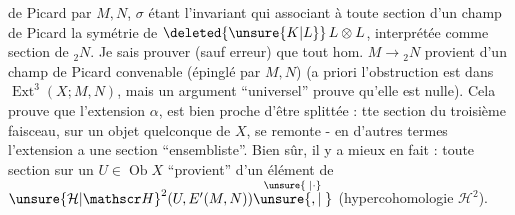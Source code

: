  de Picard  par $M,N$, $\sigma$ étant l'invariant qui  associant à toute section  d'un champ de Picard la symétrie de $\deleted{\unsure{K|L}}\,L\otimes L$, interprétée comme section de ${}_{2}N$. Je sais prouver (sauf erreur) que tout hom. $M\to{}_{2}N$ provient d'un champ de Picard convenable (épinglé par $M,N$) (a priori l'obstruction est dans $\operatorname{Ext}^{3}(X;M,N)$, mais un argument ``universel'' prouve qu'elle est nulle). Cela prouve que l'extension $\alpha$, est bien proche d'être splittée :  tte section du troisième faisceau, sur un objet quelconque de $X$, se remonte - en d'autres termes l'extension a une section ``ensembliste''. Bien sûr, il y a mieux en fait : toute section sur un $U\in\operatorname{Ob}X$ ``provient'' d'un élément de ${\unsure{\mathcal H|\mathscr H}}^{2}(U,E'(M,N))\overset{\unsure{\phantom{\cdot}|\cdot}}{\unsure{,|\phantom{,}}}$ (hypercohomologie $\mathcal H^{2}$).
